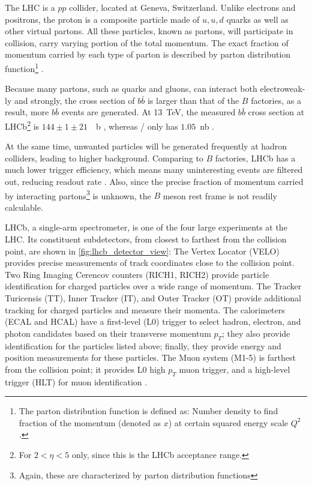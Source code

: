 The LHC is a $pp$ collider, located at Geneva, Switzerland.
Unlike electrons and positrons, the proton is a composite particle made of $u, u, d$ quarks as well as other virtual 
partons.
All these particles, known as partons, will participate in collision, carry varying portion of the total
momentum.
The exact fraction of momentum carried by each type of parton is described by 
parton distribution function\footnote{
    The parton distribution function is defined as:
    Number density to find fraction of the momentum (denoted as $x$) at certain
    squared energy scale $Q^2$.
} \cite{Ball:2014uwa}.

Because many partons, such as quarks and gluons, can interact both electroweak-ly and strongly,
the cross section of $b \bar{b}$ is larger than that of the $B$ factories, as a result, more $b \bar{b}$ events are generated.
At \SI{13}{TeV}, the measured $b \bar{b}$ cross section at LHCb\footnote{
    For $2 < \eta < 5$ only, since this is the LHCb acceptance range.
} is $144 \pm 1 \pm 21$~\si{\mu b} \cite{Aaij:2016avz}, whereas \BaBar/ only has 
$1.05$~\si{nb} \cite{Harrison:1998yr}.

At the same time, unwanted particles will be generated frequently at hadron colliders, leading to higher background.
Comparing to $B$ factories, LHCb has a much lower trigger efficiency,
which means many uninteresting events are filtered out, reducing readout
rate \cite{LHCb:2008}.
Also, since the precise fraction of momentum carried by
interacting partons\footnote{
    Again, these are characterized by parton distribution functions
} is unknown, the $B$ meson rest frame is not readily calculable.

LHCb, a single-arm spectrometer, is one of the four large experiments at the
LHC.
Its constituent subdetectors, from closest to farthest from the collision point,
are shown in \autoref{fig:lhcb_detector_view}:
The Vertex Locator (VELO) provides precise measurements of track coordinates
close to the collision point.
Two Ring Imaging Cerencov counters (RICH1, RICH2) provide particle
identification for charged particles over a wide range of momentum.
The Tracker Turicensis (TT), Inner Tracker (IT), and Outer Tracker (OT) provide additional tracking for
charged particles and measure their momenta.
The calorimeters (ECAL and HCAL) have a first-level (L0) trigger to select
hadron, electron, and photon candidates based on their transverse momentum
$p_T$;
they also provide identification for the particles listed above;
finally, they provide energy and position measurements for these particles.
The Muon system (M1-5) is farthest from the collision point;
it provides L0 high $p_T$ muon trigger, and a high-level trigger (HLT) for muon
identification \cite{LHCb:2008}.

